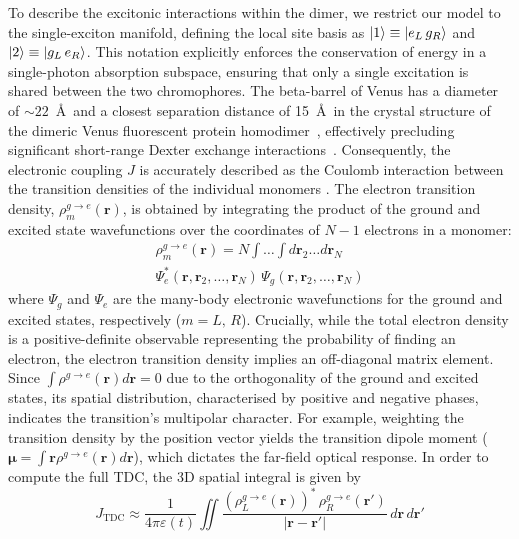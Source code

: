 \documentclass[journal=jpclcd, manuscript=letter, layout=twocolumn, doi=true]{achemso}
\begin{document}
To describe the excitonic interactions within the dimer, we restrict our model to the single-exciton manifold, defining the local site basis as $\ket{1}\equiv\ket{e_L \, g_R}$ and $\ket{2}\equiv\ket{g_L \, e_R}$. This notation explicitly enforces the conservation of energy in a single-photon absorption subspace, ensuring that only a single excitation is shared between the two chromophores. The beta-barrel of Venus has a diameter of $\sim 22$~\AA\ and a closest separation distance of 15~\AA\ in the crystal structure of the dimeric Venus fluorescent protein homodimer~\cite{kim2019venusa206}, effectively precluding significant short-range Dexter exchange interactions~\cite{skourtis2016dexter}. Consequently, the electronic coupling $J$ is accurately described as the Coulomb interaction between the transition densities of the individual monomers \cite{hsu2009}. The electron transition density, $\rho^{g\to e}_m(\mathbf r)$, is obtained by integrating the product of the ground and excited state wavefunctions over the coordinates of $N-1$ electrons in a monomer:
\begin{multline} \label{eq:transition_density}
    \rho^{g\to e}_m(\mathbf{r}) =  
    N \int \dots \int d\mathbf{r}_2 \dots d\mathbf{r}_N \\ \Psi_e^*(\mathbf{r}, \mathbf{r}_2, \dots, \mathbf{r}_N) \, \Psi_g(\mathbf{r}, \mathbf{r}_2, \dots, \mathbf{r}_N)
\end{multline}
where $\Psi_g$ and $\Psi_e$ are the many-body electronic wavefunctions for the ground and excited states, respectively ($m=L,\,R$). 
Crucially, while the total electron density is a positive-definite observable representing the probability of finding an electron, the electron transition density implies an off-diagonal matrix element. Since $\int \rho^{g\to e}(\mathbf{r}) d\mathbf{r} = 0$ due to the orthogonality of the ground and excited states, its spatial distribution, characterised by positive and negative phases, indicates the transition's multipolar character. For example, weighting the transition density by the position vector yields the transition dipole moment ($\boldsymbol{\mu} = \int \mathbf{r} \rho^{g \to e}(\mathbf{r}) d\mathbf{r}$), which dictates the far-field optical response. In order to compute the full TDC, the 3D spatial integral is given by 
\begin{equation}
    J_{\mathrm{TDC}} \approx \frac{1}{4\pi\varepsilon(t)}\iint \frac{\left(\rho^{g\to e}_L(\mathbf r)\right)^*\,\rho^{g\to e}_R(\mathbf r')}{|\mathbf r-\mathbf r'|} \,d\mathbf r\,d\mathbf r'
    \label{eq:J_integral}
\end{equation}
\end{document}
